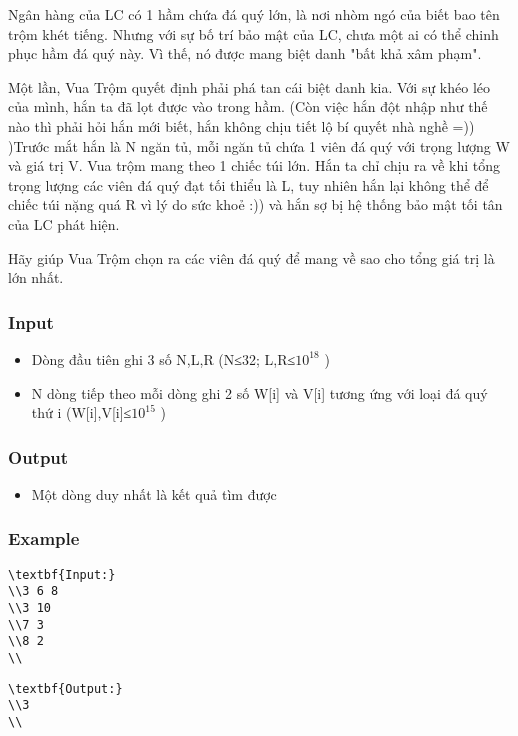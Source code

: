 



   Ngân hàng của LC có 1 hầm chứa đá quý lớn, là nơi nhòm ngó của biết bao tên trộm khét tiếng. Nhưng với sự bố trí bảo mật của LC, chưa một ai có thể chinh phục hầm đá quý này. Vì thế, nó được mang biệt danh "bất khả xâm phạm".  

   Một lần, Vua Trộm quyết định phải phá tan cái biệt danh kia. Với sự khéo léo của mình, hắn ta đã lọt được vào trong hầm. (Còn việc hắn đột nhập như thế nào thì phải hỏi hắn mới biết, hắn không chịu tiết lộ bí quyết nhà nghề =)) )Trước mắt hắn là N ngăn tủ, mỗi ngăn tủ chứa 1 viên đá quý với trọng lượng W và giá trị V. Vua trộm mang theo 1 chiếc túi lớn. Hắn ta chỉ chịu ra về khi tổng trọng lượng các viên đá quý đạt tối thiểu là L, tuy nhiên hắn lại không thể để chiếc túi nặng quá R vì lý do sức khoẻ :)) và hắn sợ bị hệ thống bảo mật tối tân của LC phát hiện.  

   Hãy giúp Vua Trộm chọn ra các viên đá quý để mang về sao cho tổng giá trị là lớn nhất.  

\subsubsection{   Input  }
\begin{itemize}
	\item     Dòng đầu tiên ghi 3 số N,L,R (N≤32; L,R≤$10^{18}$    )   
	\item     N dòng tiếp theo mỗi dòng ghi 2 số W[i] và V[i] tương ứng với loại đá quý thứ i (W[i],V[i]≤$10^{15}$    )   
\end{itemize}

\subsubsection{   Output  }
\begin{itemize}
	\item     Một dòng duy nhất là kết quả tìm được   
\end{itemize}

\subsubsection{   Example  }
\begin{verbatim}
\textbf{Input:}
\\3 6 8
\\3 10
\\7 3
\\8 2
\\\end{verbatim}
\begin{itemize}
\end{itemize}
\begin{verbatim}
\textbf{Output:}
\\3
\\\end{verbatim}
